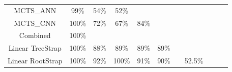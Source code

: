 \documentclass[a4paper,12pt,table]{article}
\begin{document}
\begin{table}[H]
{\begin{tabular}{|c|cccccccccc}
    MCTS\_ANN      & \multicolumn{1}{c|}{99\%}                       & \multicolumn{1}{c|}{54\%}                       & \multicolumn{1}{c|}{52\%}                       & \cellcolor[HTML]{000000}{\color[HTML]{000000} } & \cellcolor[HTML]{000000}{\color[HTML]{000000} } & \cellcolor[HTML]{000000}{\color[HTML]{000000} } & \cellcolor[HTML]{000000}{\color[HTML]{000000} } & \cellcolor[HTML]{000000}{\color[HTML]{000000} } & \cellcolor[HTML]{000000}{\color[HTML]{000000} } & \cellcolor[HTML]{000000}{\color[HTML]{000000} } \\ \cline{1-5}
    MCTS\_CNN      & \multicolumn{1}{c|}{100\%}                      & \multicolumn{1}{c|}{72\%}                       & \multicolumn{1}{c|}{67\%}                       & \multicolumn{1}{c|}{84\%}                       & \cellcolor[HTML]{000000}                        & \cellcolor[HTML]{000000}                        & \cellcolor[HTML]{000000}                        & \cellcolor[HTML]{000000}                        & \cellcolor[HTML]{000000}                        & \cellcolor[HTML]{000000}                        \\ \cline{1-6}
    Combined        & \multicolumn{1}{c|}{100\%}                    & \multicolumn{1}{c|}{}                            & \multicolumn{1}{c|}{}                       & \multicolumn{1}{c|}{}                       & \multicolumn{1}{c|}{}                                           & \cellcolor[HTML]{000000}                     & \cellcolor[HTML]{000000}                       & \cellcolor[HTML]{000000}                        & \cellcolor[HTML]{000000}                        & \cellcolor[HTML]{000000}                        \\ \cline{1-7}
    Linear TreeStrap & \multicolumn{1}{c|}{100\%}                    & \multicolumn{1}{c|}{88\%}                       & \multicolumn{1}{c|}{89\%}                       & \multicolumn{1}{c|}{89\%}                       & \multicolumn{1}{c|}{89\%}                       & \multicolumn{1}{c|}{}                           & \cellcolor[HTML]{000000}                        & \cellcolor[HTML]{000000}                        & \cellcolor[HTML]{000000}                        & \cellcolor[HTML]{000000}                        \\ \cline{1-8}
    Linear RootStrap & \multicolumn{1}{c|}{100\%}                    & \multicolumn{1}{c|}{92\%}                       & \multicolumn{1}{c|}{100\%}                      & \multicolumn{1}{c|}{91\%}                       & \multicolumn{1}{c|}{90\%}                       & \multicolumn{1}{c|}{}                           & \multicolumn{1}{c|}{52.5\%}                           & \cellcolor[HTML]{000000}                        & \cellcolor[HTML]{000000}                        & \cellcolor[HTML]{000000}                        \\ \cline{1-9}

\end{tabular}}
\end{table}
\end{document}
